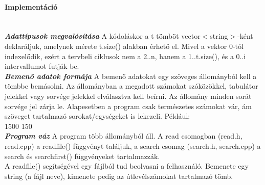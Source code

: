 \documentclass[12pt]{report}
\begin{document}
\paragraph{Implementáció} \hspace{0pt} \\

\textit{\textbf{Adattípusok megvalósítása}} \newline
A kódoláskor a t tömböt vector$<$string$>$-ként deklaráljuk, amelynek mérete t.size() alakban érhető el. Mivel a vektor 0-tól indexelődik, ezért a tervbeli ciklusok nem a 2..n, hanem a 1..t.size(), és a 0..i intervallumot futják be. \\

\textit{\textbf{Bemenő adatok formája}} \newline
A bemenő adatokat egy szöveges állományból kell a tömbbe bemásolni. Az állományban a megadott számokat szóközökkel, tabulátor jelekkel vagy sorvége jelekkel elválasztva kell beírni. Az állomány minden sorát sorvége jel zárja le. Alapesetben a program csak természetes számokat vár, ám szöveget tartalmazó sorokat/egységeket is lekezeli. Például:\\
1500	150   \\

\textit{\textbf{Program váz}} \newline
A program több állományból áll. A read csomagban (read.h, read.cpp) a readfile() függvényt találjuk, a search csomag (search.h, search.cpp) a search és searchfirst() függvényeket tartalmazzák. \\

A readfile() segítségével egy fájlból tud beolvasni a felhasználó. Bemenete egy string (a fájl neve), kimenete pedig az útlevélszámokat tartalmazó tömb. \\

\end{document}
